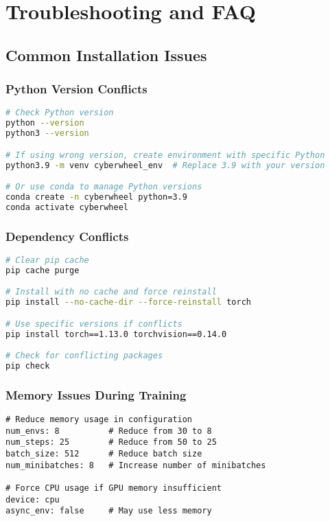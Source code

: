 \documentclass[12pt,a4paper]{article}
\begin{document}
\section{Troubleshooting and FAQ}

\subsection{Common Installation Issues}

\subsubsection{Python Version Conflicts}
\begin{lstlisting}[language=bash, caption=Python Version Issues]
# Check Python version
python --version
python3 --version

# If using wrong version, create environment with specific Python
python3.9 -m venv cyberwheel_env  # Replace 3.9 with your version

# Or use conda to manage Python versions
conda create -n cyberwheel python=3.9
conda activate cyberwheel
\end{lstlisting}

\subsubsection{Dependency Conflicts}
\begin{lstlisting}[language=bash, caption=Resolve Dependency Issues]
# Clear pip cache
pip cache purge

# Install with no cache and force reinstall
pip install --no-cache-dir --force-reinstall torch

# Use specific versions if conflicts
pip install torch==1.13.0 torchvision==0.14.0

# Check for conflicting packages
pip check
\end{lstlisting}

\subsubsection{Memory Issues During Training}
\begin{lstlisting}[caption=Memory-Optimized Configuration]
# Reduce memory usage in configuration
num_envs: 8          # Reduce from 30 to 8
num_steps: 25        # Reduce from 50 to 25
batch_size: 512      # Reduce batch size
num_minibatches: 8   # Increase number of minibatches

# Force CPU usage if GPU memory insufficient
device: cpu
async_env: false     # May use less memory
\end{lstlisting}
\end{document}
